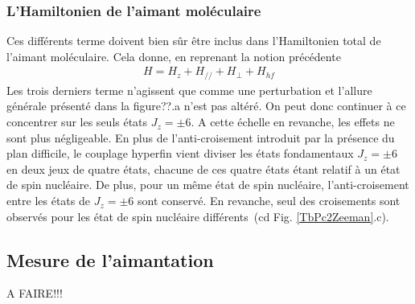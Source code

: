 \subsubsection{L'Hamiltonien de l'aimant moléculaire}

Ces différents terme doivent bien s\^ur \^etre inclus dans l'Hamiltonien total de l'aimant moléculaire. Cela donne, en reprenant la notion précédente
\begin{eqnarray}
H = H_z + H_{//} + H_{\perp} + H_{hf}
\end{eqnarray}
Les trois derniers terme n'agissent que comme une perturbation et l'allure générale présenté dans la figure??.a n'est pas altéré. On peut donc continuer à ce concentrer sur les seuls états $J_z = \pm 6$. A cette échelle en revanche, les effets ne sont plus négligeable. En plus de l'anti-croisement introduit par la présence du plan difficile, le couplage hyperfin vient diviser les états fondamentaux  $J_z = \pm 6$ en deux jeux de quatre états, chacune de ces quatre états étant relatif à un état de spin nucléaire. De plus, pour un m\^eme état de spin nucléaire, l'anti-croisement entre les états de  $J_z = \pm 6$ sont conservé. En revanche, seul des croisements sont observés pour les état de spin nucléaire différents~(cd Fig. \ref{TbPc2Zeeman}.c).

\subsection{Mesure de l'aimantation}

A FAIRE!!!